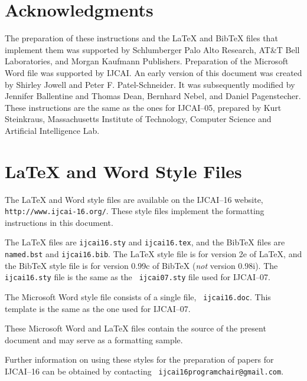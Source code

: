 \documentclass{article}
\begin{document}
\section*{Acknowledgments}

The preparation of these instructions and the \LaTeX{} and Bib\TeX{}
files that implement them was supported by Schlumberger Palo Alto
Research, AT\&T Bell Laboratories, and Morgan Kaufmann Publishers.
Preparation of the Microsoft Word file was supported by IJCAI.  An
early version of this document was created by Shirley Jowell and Peter
F. Patel-Schneider.  It was subsequently modified by Jennifer
Ballentine and Thomas Dean, Bernhard Nebel, and Daniel Pagenstecher.
These instructions are the same as the ones for IJCAI--05, prepared by
Kurt Steinkraus, Massachusetts Institute of Technology, Computer
Science and Artificial Intelligence Lab.

\appendix

\section{\LaTeX{} and Word Style Files}\label{stylefiles}

The \LaTeX{} and Word style files are available on the IJCAI--16
website, {\tt http://www.ijcai-16.org/}.
These style files implement the formatting instructions in this
document.

The \LaTeX{} files are {\tt ijcai16.sty} and {\tt ijcai16.tex}, and
the Bib\TeX{} files are {\tt named.bst} and {\tt ijcai16.bib}. The
\LaTeX{} style file is for version 2e of \LaTeX{}, and the Bib\TeX{}
style file is for version 0.99c of Bib\TeX{} ({\em not} version
0.98i). The {\tt ijcai16.sty} file is the same as the {\tt
ijcai07.sty} file used for IJCAI--07.

The Microsoft Word style file consists of a single file, {\tt
ijcai16.doc}. This template is the same as the one used for
IJCAI--07.

These Microsoft Word and \LaTeX{} files contain the source of the
present document and may serve as a formatting sample.  

Further information on using these styles for the preparation of
papers for IJCAI--16 can be obtained by contacting {\tt
ijcai16programchair@gmail.com}.



\end{document}
